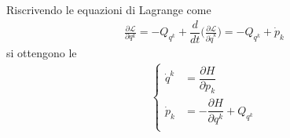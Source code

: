 \documentclass[letterpaper,10pt,english]{jupyterBook}
\begin{document}
\sphinxAtStartPar
Riscrivendo le equazioni di Lagrange come
\begin{equation*}
\begin{split}\frac{\partial \mathscr{L}}{\partial q^k} = - Q_{q^k} + \dfrac{d}{dt}\Big( \frac{\partial \mathscr{L}}{\partial \dot{q}^k} \Big) = -Q_{q^k} + \dot{p}_k\end{split}
\end{equation*}
\sphinxAtStartPar
si ottengono le 
\begin{equation*}
\begin{split}\begin{cases}
 \dot{q}^k & = \dfrac{\partial H}{\partial p_k} \\
 \dot{p}_k & =-\dfrac{\partial H}{\partial q^k} + Q_{q^k} \\
\end{cases}\end{split}
\end{equation*}






\renewcommand{\indexname}{Index}
\printindex
\end{document}
